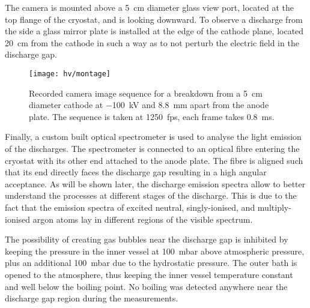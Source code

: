 The camera is mounted above a \SI{5}{\centi\metre} diameter glass view port, located at the top flange of the cryostat, and is looking downward.
To observe a discharge from the side a glass mirror plate is installed at the edge of the cathode plane, located \SI{20}{\centi\metre} from the cathode in such a way as to not perturb the electric field in the discharge gap. 

\begin{figure}[tbp]
	\centering	
	\texttt{[image: hv/montage]}
	\caption[ study high-speed footage]{%
		Recorded camera image sequence for a breakdown from a \SI{5}{\centi\metre} diameter cathode at \SI{-100}{\kilo\volt} and \SI{8.8}{\milli\metre} apart from the anode plate.
		The sequence is taken at \SI{1250}{fps}, each frame takes \SI{0.8}{\milli\second}.
	}
	\label{fig:hv_images}
\end{figure}

Finally, a custom built optical spectrometer is used to analyse the light emission of the discharges.
The spectrometer is connected to an optical fibre entering the cryostat with its other end attached to the anode plate.
The fibre is aligned such that its end directly faces the discharge gap resulting in a high angular acceptance.
As will be shown later, the discharge emission spectra allow to better understand the processes at different stages of the discharge.
This is due to the fact that the emission spectra of excited neutral, singly-ionised, and multiply-ionised argon atoms lay in different regions of the visible spectrum.

The possibility of creating gas bubbles near the discharge gap is inhibited by keeping the pressure in the inner vessel at \SI{100}{\milli\bar} above atmospheric pressure, plus an additional \SI{100}{\milli\bar} due to the hydrostatic pressure.
The outer bath is opened to the atmosphere, thus keeping the inner vessel temperature constant and well below the boiling point.
No boiling was detected anywhere near the discharge gap region during the measurements.

